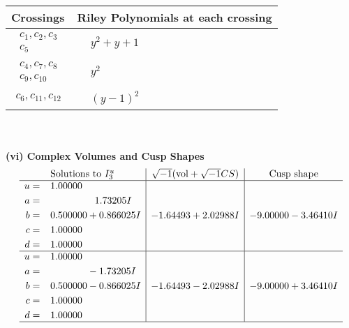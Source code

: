 \documentclass[1p]{elsarticle_modified}
\theoremstyle{definition}
\newcommand{\I}{\sqrt{-1}}
\begin{document}
\begin{tabular}{m{50pt}|m{274pt}}
Crossings & \hspace{64pt}Riley Polynomials at each crossing \\
\hline $$\begin{aligned}c_{1},c_{2},c_{3}\\c_{5}\end{aligned}$$&$\begin{aligned}
&y^2+y+1
\end{aligned}$\\
\hline $$\begin{aligned}c_{4},c_{7},c_{8}\\c_{9},c_{10}\end{aligned}$$&$\begin{aligned}
&y^2
\end{aligned}$\\
\hline $$\begin{aligned}c_{6},c_{11},c_{12}\end{aligned}$$&$\begin{aligned}
&(y-1)^2
\end{aligned}$\\
\hline
\end{tabular}\\~\\
\newpage\flushleft \textbf{(vi) Complex Volumes and Cusp Shapes}
$$\begin{array}{c|c|c}  
\text{Solutions to }I^u_{3}& \I (\text{vol} + \sqrt{-1}CS) & \text{Cusp shape}\\
 \hline 
\begin{aligned}
u &= \phantom{-}1.00000\phantom{ +0.000000I} \\
a &= \phantom{-0.000000 -}1.73205 I \\
b &= \phantom{-}0.500000 + 0.866025 I \\
c &= \phantom{-}1.00000\phantom{ +0.000000I} \\
d &= \phantom{-}1.00000\phantom{ +0.000000I}\end{aligned}
 & -1.64493 + 2.02988 I & -9.00000 - 3.46410 I \\ \hline\begin{aligned}
u &= \phantom{-}1.00000\phantom{ +0.000000I} \\
a &= \phantom{-0.000000 } -1.73205 I \\
b &= \phantom{-}0.500000 - 0.866025 I \\
c &= \phantom{-}1.00000\phantom{ +0.000000I} \\
d &= \phantom{-}1.00000\phantom{ +0.000000I}\end{aligned}
 & -1.64493 - 2.02988 I & -9.00000 + 3.46410 I\\
 \hline 
 \end{array}$$\newpage\newpage\renewcommand{\arraystretch}{1}
\end{document}
